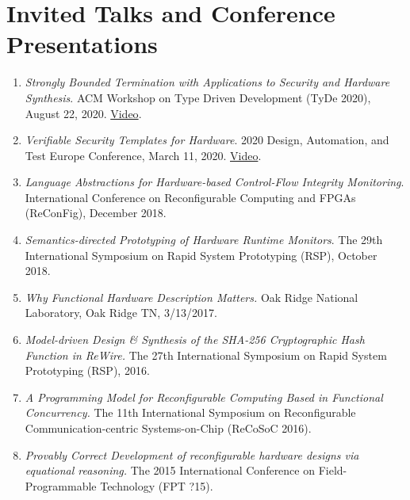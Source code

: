 \documentclass[12pt]{article} %
\begin{document}


\section*{Invited Talks and Conference Presentations}

\begin{enumerate}[leftmargin=0mm]

\item{\it Strongly Bounded Termination with Applications to Security and Hardware Synthesis}. ACM Workshop on Type Driven Development (TyDe 2020), August 22, 2020. \href{https://www.youtube.com/watch?v=IQ2Xp4mWBIk}{Video}.

\item{\it Verifiable Security Templates for Hardware}. 2020 Design, Automation, and Test Europe Conference, March 11, 2020. \href{https://www.youtube.com/watch?v=EOCoqE7PZNs}{Video}.

\item{\it Language Abstractions for Hardware-based Control-Flow Integrity Monitoring}.  International Conference on Reconfigurable Computing and FPGAs (ReConFig), December 2018.

\item{\it Semantics-directed Prototyping of Hardware Runtime Monitors}. The 29th International Symposium on Rapid System Prototyping (RSP), October 2018.

\item{\it Why Functional Hardware Description Matters.}
Oak Ridge National Laboratory, Oak Ridge TN, 3/13/2017.


\item{\it Model-driven Design \& Synthesis of the SHA-256 Cryptographic Hash Function in ReWire.} The 27th International Symposium on Rapid System Prototyping (RSP), 2016.

\item{\it A Programming Model for Reconfigurable Computing Based in Functional Concurrency.} The 11th International Symposium on Reconfigurable Communication-centric Systems-on-Chip (ReCoSoC 2016).

\item{\it Provably Correct Development of reconfigurable hardware designs via equational reasoning.} The 2015 International Conference on Field-Programmable Technology (FPT ?15).


\end{enumerate}
\end{document}

